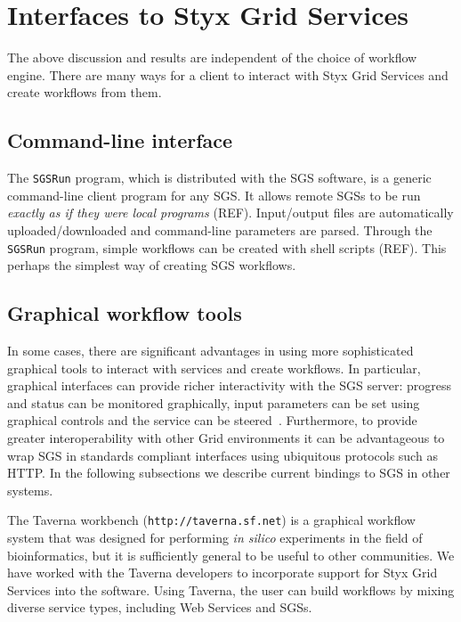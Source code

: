 \documentclass[a4paper]{article}
\begin{document}
\section{Interfaces to Styx Grid Services}\label{sec:interfaces}

The above discussion and results are independent of the choice of workflow engine.  There are many ways for a client to interact with Styx Grid Services and create workflows from them.

\subsection{Command-line interface}\label{sec:sgsrun}
The \texttt{SGSRun} program, which is distributed with the SGS software, is a generic command-line client program for any SGS.  It allows remote SGSs to be run \textit{exactly as if they were local programs} (REF).  Input/output files are automatically uploaded/downloaded and command-line parameters are parsed.  Through the \texttt{SGSRun} program, simple workflows can be created with shell scripts (REF).  This perhaps the simplest way of creating SGS workflows.

\subsection{Graphical workflow tools}\label{subsec:graphical-workflow}
In some cases, there are significant advantages in using more sophisticated graphical tools to interact with services and create workflows.  In particular, graphical interfaces can provide richer interactivity with the SGS server: progress and status can be monitored graphically, input parameters can be set using graphical controls and the service can be steered~\cite{blower:2005}. Furthermore, to provide greater interoperability with other Grid environments it can be advantageous to wrap SGS in standards compliant interfaces using ubiquitous protocols such as HTTP. In the following subsections we describe current bindings to SGS in other systems.

The Taverna workbench (\texttt{http://taverna.sf.net}) is a graphical workflow system that was designed for performing {\it in silico} experiments in the field of bioinformatics, but it is sufficiently general to be useful to other communities.  We have worked with the Taverna developers to incorporate support for Styx Grid Services into the software.  Using Taverna, the user can build workflows by mixing diverse service types, including Web Services and SGSs.
\end{document}
